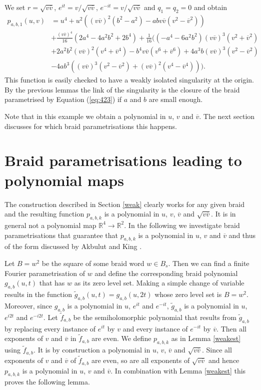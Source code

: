 \documentclass[notitlepage,12pt]{revtex4-1}
\begin{document}
We set $r=\sqrt{v\overline{v}}$, $e^{it}=v/\sqrt{v\overline{v}}$, $e^{-it}=v/\sqrt{v\overline{v}}$ and $q_{1}=q_{2}=0$ and obtain
\begin{align}
\label{eq:423subss}
p_{a,b,1}(u,v)&=u^4+u^2((v\overline{v})^{2}(b^2-a^2)-abv\overline{v}(v^2-\overline{v}^2))\nonumber\\
&+\frac{(v\overline{v})^4}{16}(2a^4-4a^2b^2+2b^4)+\frac{1}{16}((-a^4-6a^2b^2)(v\overline{v})^3(v^2+\overline{v}^2)\nonumber\\
&+2a^2b^2(v\overline{v})^2(v^4+\overline{v}^4)-b^4v\overline{v}(v^6+\overline{v}^6)+4a^3b(v\overline{v})^3
(v^2-\overline{v}^2)\nonumber\\
&-4ab^3((v\overline{v})^3(v^2-\overline{v}^2)+(v\overline{v})^2(v^4-\overline{v}^4))).
\end{align}
This function is easily checked to have a weakly isolated singularity at the origin. By the previous lemmas the link of the singularity is the closure of the braid parametrised by Equation (\ref{eq:423}) if $a$ and $b$ are small enough.

Note that in this example we obtain a polynomial in $u$, $v$ and $\overline{v}$. The next section discusses for which braid parametrisations this happens.

\section{Braid parametrisations leading to polynomial maps} 
\label{polynomial}
The construction described in Section \ref{weak} clearly works for any given braid and the resulting function $p_{a,b,k}$ is a polynomial in $u$, $v$, $\overline{v}$ and $\sqrt{v\overline{v}}$. It is in general not a polynomial map $\mathbb{R}^{4}\to\mathbb{R}^{2}$. In the following we investigate braid parametrisations that guarantee that $p_{a,b,k}$ is a polynomial in $u$, $v$ and $\overline{v}$ and thus of the form discussed by Akbulut and King \cite{ak:1981all}.

Let $B=w^2$ be the square of some braid word $w\in B_{s}$. Then we can find a finite Fourier parametrisation of $w$ and define the corresponding braid polynomial $g_{a,b}(u,t)$ that has $w$ as its zero level set. Making a simple change of variable results in the function $\tilde{g}_{a,b}(u,t)=g_{a,b}(u,2t)$ whose zero level set is $B=w^2$. Moreover, since $g_{a,b}$ is a polynomial in $u$, $e^{it}$ and $e^{-it}$, $\tilde{g}_{a,b}$ is a polynomial in $u$, $e^{i2t}$ and $e^{-i2t}$. Let $\tilde{f}_{a,b}$ be the semiholomorphic polynomial that results from $\tilde{g}_{a,b}$ by replacing every instance of $e^{it}$ by $v$ and every instance of $e^{-it}$ by $\overline{v}$. Then all exponents of $v$ and $\overline{v}$ in $\tilde{f}_{a,b}$ are even. We define $p_{a,b,k}$ as in Lemma \ref{weakest} using $\tilde{f}_{a,b}$. It is by construction a polynomial in $u$, $v$, $\overline{v}$ and $\sqrt{v\overline{v}}$. Since all exponents of $v$ and $\overline{v}$ of $\tilde{f}_{a,b}$ are even, so are all exponents of $\sqrt{v\overline{v}}$ and hence $p_{a,b,k}$ is a polynomial in $u$, $v$ and $\overline{v}$. In combination with Lemma \ref{weakest} this proves the following lemma.
\end{document}
